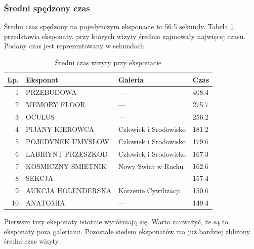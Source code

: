 \documentclass[conference]{IEEEtran}
\begin{document}
\subsubsection{Średni spędzony czas}
Średni czas spędzony na pojedynczym eksponacie to 56.5 sekundy. Tabela \ref{top_czas} przedstawia eksponaty, przy których wizyty średnio zajmowały najwięcej czasu. Podany czas jest reprezentowany w sekundach.

\begin{table}[H]
\caption{Średni czas wizyty przy eksponacie}
\label{top_czas}
\centering
\begin{tabular}{|r|l|l|l|}
\hline
\textbf{Lp.} & \textbf{Eksponat} & \textbf{Galeria} & \textbf{Czas} \\
\hline
1  &         PRZEBUDOWA &                --- &  408.4    \\
2  &       MEMORY FLOOR &                --- &  275.7    \\
3  &             OCULUS &                --- &  256.2    \\
4  &    PIJANY KIEROWCA & Czlowiek i Srodowisko &  181.2    \\
5  &  POJEDYNEK UMYSLOW & Czlowiek i Srodowisko &  179.6    \\
6  & LABIRYNT PRZESZKOD & Czlowiek i Srodowisko &  167.3    \\
7  & KOSMICZNY SMIETNIK &    Nowy Swiat w Ruchu &  162.6    \\
8  &             SEKCJA &                --- &  157.4    \\
9  & AUKCJA HOLENDERSKA &  Korzenie Cywilizacji &  150.6    \\
10 &           ANATOMIA &                --- &  149.4    \\
\hline
\end{tabular}
\end{table}
Pierwsze trzy eksponaty istotnie wyróżniają się. Warto zauważyć, że są to eksponaty poza galeriami. Pozostałe siedem eksponatów ma już bardziej zbliżony średni czas wizyty.
\end{document}
